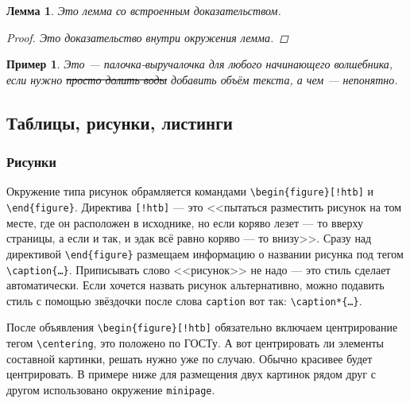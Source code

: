 \documentclass[14pt, russian]{scrartcl}
\newcounter{cExample}
\newcounter{cLemma}
\newtheorem{Example}{Пример}[cExample]
\newtheorem{Lemma}{Лемма}[cLemma]
\begin{document}
\begin{Lemma}
Это лемма со встроенным доказательством.
\begin{proof}
Это доказательство внутри окружения лемма.
\end{proof}
\end{Lemma} 

\begin{Example}
Это --- палочка-выручалочка для любого начинающего волшебника, если нужно \sout{просто долить воды} добавить объём текста, а чем --- непонятно. 
\end{Example}

\subsection{Таблицы, рисунки, листинги}

\subsubsection{Рисунки}

Окружение типа рисунок обрамляется командами \texttt{\textbackslash begin\{figure\}[!htb]} и \texttt{\textbackslash end\{figure\}}. Директива \texttt{[!htb]} --- это <<пытаться разместить рисунок на том месте, где он расположен в исходнике, но если коряво лезет --- то вверху страницы, а если и так, и эдак всё равно коряво --- то внизу>>. Сразу над директивой \texttt{\textbackslash end\{figure\}} размещаем информацию о названии рисунка под тегом \texttt{\textbackslash{caption}\{\dots\}}. Приписывать слово <<рисунок>> не надо --- это стиль сделает автоматически. Если хочется назвать рисунок альтернативно, можно подавить стиль с помощью звёздочки после слова \texttt{caption} вот так: \texttt{\textbackslash{caption*}\{\dots\}}.

После объявления \texttt{\textbackslash begin\{figure\}[!htb]} обязательно включаем центрирование тегом \texttt{\textbackslash centering}, это положено по ГОСТу. А вот центрировать ли элементы составной картинки, решать нужно уже по случаю. Обычно красивее будет центрировать. В примере ниже для размещения двух картинок рядом друг с другом использовано окружение \texttt{minipage}. 
\end{document}
